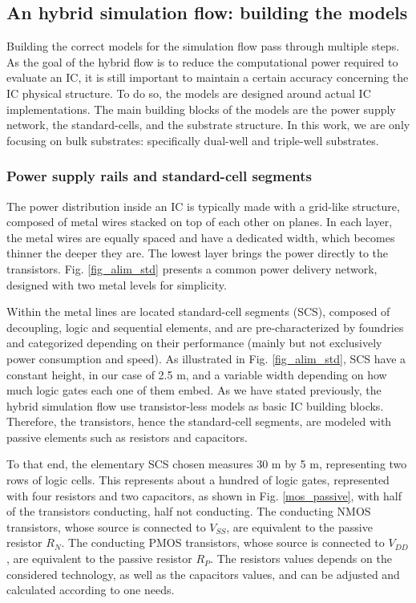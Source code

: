 \subsection{An hybrid simulation flow: building the models}
	Building the correct models for the simulation flow pass through multiple steps.
	As the goal of the hybrid flow is to reduce the computational power required to evaluate an IC, it is still important to maintain a certain accuracy concerning the IC physical structure.
	To do so, the models are designed around actual IC implementations.
	The main building blocks of the models are the power supply network, the standard-cells, and the substrate structure.
	In this work, we are only focusing on bulk substrates: specifically dual-well and triple-well substrates.

	\subsubsection{Power supply rails and standard-cell segments}
	
	The power distribution inside an IC is typically made with a grid-like structure, composed of metal wires stacked on top of each other on planes.
	In each layer, the metal wires are equally spaced and have a dedicated width, which becomes thinner the deeper they are.
	The lowest layer brings the power directly to the transistors.
	Fig. \ref{fig_alim_std} presents a common power delivery network, designed with two metal levels for simplicity.

	Within the metal lines are located standard-cell segments (SCS), composed of decoupling, logic and sequential elements, and are pre-characterized by foundries and categorized depending on their performance (mainly but not exclusively power consumption and speed).
	As illustrated in Fig. \ref{fig_alim_std}, SCS have a constant height, in our case of 2.5 \textmu m, and a variable width depending on how much logic gates each one of them embed.
	As we have stated previously, the hybrid simulation flow use transistor-less models as basic IC building blocks.
	Therefore, the transistors, hence the standard-cell segments, are modeled with passive elements such as resistors and capacitors.

	
	To that end, the elementary SCS chosen measures 30 \textmu m by 5 \textmu m, representing two rows of logic cells.
	This represents about a hundred of logic gates, represented with four resistors and two capacitors, as shown in Fig. \ref{mos_passive}, with half of the transistors conducting, half not conducting.
	The conducting NMOS transistors, whose source is connected to $V_{SS}$, are equivalent to the passive resistor $R_N$.
	The conducting PMOS transistors, whose source is connected to $V_{DD}$, are equivalent to the passive resistor $R_P$.
	The resistors values depends on the considered technology, as well as the capacitors values, and can be adjusted and calculated according to one needs.

